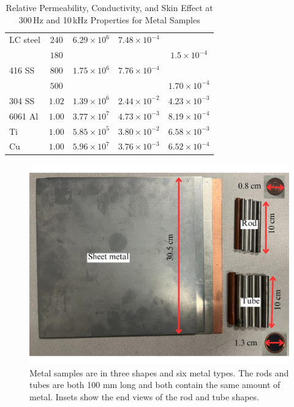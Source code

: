 \documentclass[journal,twoside,web]{ieeecolor}
\begin{document}
\begin{table}[!htbp]
\caption{Relative Permeability, Conductivity, and Skin Effect at 300\,Hz and 10\,kHz  Properties for Metal Samples}
\label{material_prop}
\setlength{\tabcolsep}{3pt}
\centering
\begin{tabular}{|l|c|c|c|c|}
\hline
\parbox{45pt}{} & 
\parbox{25pt}{} & 
\parbox{45pt}{} & 
\parbox{50pt}{} &
\parbox{50pt}{}\\
\hline

LC steel& 
$240$& $6.29\times10^6$&$7.48\times10^{-4}$&$ $ \\
$ $ & $180$& $ $&$ $&$1.5\times10^{-4}$ \\

416 SS& 
$800$& $1.75\times10^6$&$7.76\times10^{-4}$&$ $ \\
$ $& $500$& $ $&$ $&$1.70\times10^{-4}$ \\

304 SS& 
$1.02$& $1.39\times10^6$&$2.44\times10^{-2}$&$4.23\times10^{-3}$ \\

6061 Al& 
$1.00$& $3.77\times10^7$&$4.73\times10^{-3}$&$8.19\times10^{-4}$ \\

Ti& 
$1.00$& $5.85\times10^5$&$3.80\times10^{-2}$&$6.58\times10^{-3}$ \\

Cu& 
$1.00$& $5.96\times10^7$&$3.76\times10^{-3}$&$6.52\times10^{-4}$ \\
\hline
\end{tabular}
\end{table}

\begin{figure}[!htbp]
\centerline{\includegraphics[width=\columnwidth]{chaic4.png}}
\caption{Metal samples are in three shapes and six metal types. The rods and tubes are both 100 mm long and both contain the same amount of metal. Insets show the end views of the rod and tube shapes.}
\label{Sample}
\end{figure}
\end{document}
